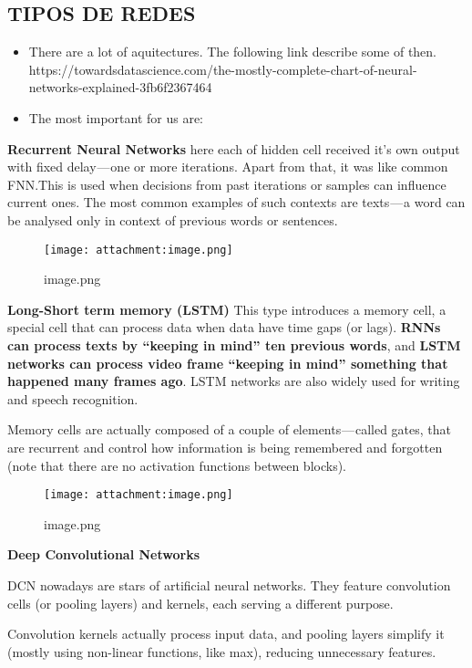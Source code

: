 \documentclass[11pt]{article}
\makeatletter
\def\maxwidth{\ifdim\Gin@nat@width>\linewidth\linewidth
    \else\Gin@nat@width\fi}
\let\Oldincludegraphics\includegraphics
\renewcommand{\includegraphics}[1]{\Oldincludegraphics[width=.8\maxwidth]{#1}}
\makeatother
\begin{document}
    \hypertarget{tipos-de-redes}{%
\subsection{TIPOS DE REDES}\label{tipos-de-redes}}

\begin{itemize}
\item
  There are a lot of aquitectures. The following link describe some of
  then.
  https://towardsdatascience.com/the-mostly-complete-chart-of-neural-networks-explained-3fb6f2367464
\item
  The most important for us are:
\end{itemize}

\textbf{Recurrent Neural Networks} here each of hidden cell received
it's own output with fixed delay --- one or more iterations. Apart from
that, it was like common FNN.This is used when decisions from past
iterations or samples can influence current ones. The most common
examples of such contexts are texts --- a word can be analysed only in
context of previous words or sentences.

\begin{figure}
\centering
\texttt{[image: attachment:image.png]}
\caption{image.png}
\end{figure}

\textbf{Long-Short term memory (LSTM)} This type introduces a memory
cell, a special cell that can process data when data have time gaps (or
lags). \textbf{RNNs can process texts by ``keeping in mind'' ten
previous words}, and \textbf{LSTM networks can process video frame
``keeping in mind'' something that happened many frames ago}. LSTM
networks are also widely used for writing and speech recognition.

Memory cells are actually composed of a couple of elements --- called
gates, that are recurrent and control how information is being
remembered and forgotten (note that there are no activation functions
between blocks).

\begin{figure}
\centering
\texttt{[image: attachment:image.png]}
\caption{image.png}
\end{figure}

\textbf{Deep Convolutional Networks}

DCN nowadays are stars of artificial neural networks. They feature
convolution cells (or pooling layers) and kernels, each serving a
different purpose.

Convolution kernels actually process input data, and pooling layers
simplify it (mostly using non-linear functions, like max), reducing
unnecessary features.
\end{document}
